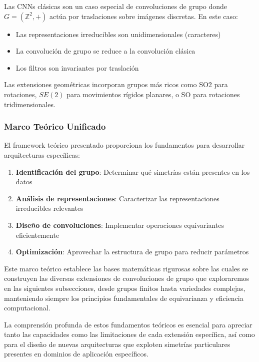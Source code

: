 Las \glspl{CNN} clásicas son un caso especial de convoluciones de grupo donde $G = (\mathbb{Z}^2, +)$ actúa por traslaciones sobre imágenes discretas. En este caso:

\begin{itemize}
    \item Las representaciones irreducibles son unidimensionales (caracteres)
    \item La convolución de grupo se reduce a la convolución clásica
    \item Los filtros son invariantes por traslación
\end{itemize}

Las extensiones geométricas incorporan grupos más ricos como \gls{SO2} para rotaciones, $SE(2)$ para movimientos rígidos planares, o \gls{SO} para rotaciones tridimensionales.

\subsubsection{Marco Teórico Unificado}

El framework teórico presentado proporciona los fundamentos para desarrollar arquitecturas específicas:

\begin{enumerate}
    \item \textbf{Identificación del grupo}: Determinar qué simetrías están presentes en los datos
    \item \textbf{Análisis de representaciones}: Caracterizar las representaciones irreducibles relevantes
    \item \textbf{Diseño de convoluciones}: Implementar operaciones equivariantes eficientemente
    \item \textbf{Optimización}: Aprovechar la estructura de grupo para reducir parámetros
\end{enumerate}

Este marco teórico establece las bases matemáticas rigurosas sobre las cuales se construyen las diversas extensiones de convoluciones de grupo que exploraremos en las siguientes subsecciones, desde grupos finitos hasta variedades complejas, manteniendo siempre los principios fundamentales de equivarianza y eficiencia computacional.

La comprensión profunda de estos fundamentos teóricos es esencial para apreciar tanto las capacidades como las limitaciones de cada extensión específica, así como para el diseño de nuevas arquitecturas que exploten simetrías particulares presentes en dominios de aplicación específicos.

